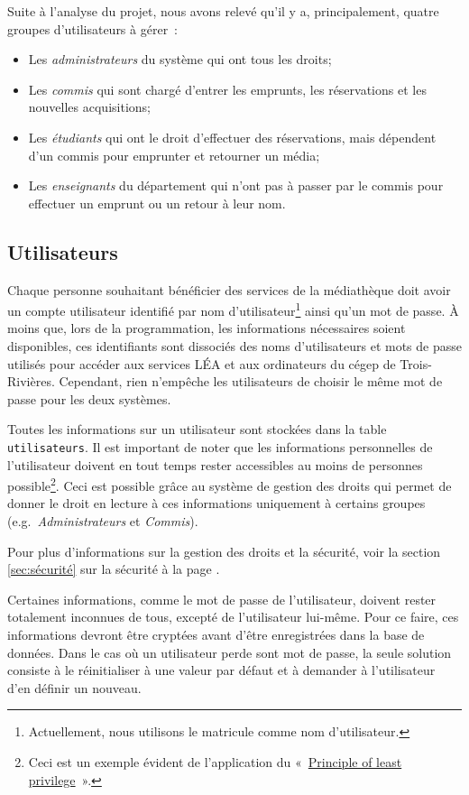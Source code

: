 \documentclass[letter, 11pt]{report}
\begin{document}
Suite à l'analyse du projet, nous avons relevé qu'il y a, principalement, quatre groupes d'utilisateurs à gérer~:
\begin{itemize}
	\item Les \emph{administrateurs} du système qui ont tous les droits;
	\item Les \emph{commis} qui sont chargé d'entrer les emprunts, les réservations et les nouvelles acquisitions;
	\item Les \emph{étudiants} qui ont le droit d'effectuer des réservations, mais dépendent d'un commis pour emprunter et retourner un média;
	\item Les \emph{enseignants} du département qui n'ont pas à passer par le commis pour effectuer un emprunt ou un retour à leur nom.
\end{itemize}

\subsection{Utilisateurs}
Chaque personne souhaitant bénéficier des services de la médiathèque doit avoir un compte utilisateur identifié par nom d'utilisateur\footnote{Actuellement, nous utilisons le matricule comme nom d'utilisateur.} ainsi qu'un mot de passe. À moins que, lors de la programmation, les informations nécessaires soient disponibles, ces identifiants sont dissociés des noms d'utilisateurs et mots de passe utilisés pour accéder aux services LÉA et aux ordinateurs du cégep de Trois-Rivières. Cependant, rien n'empêche les utilisateurs de choisir le même mot de passe pour les deux systèmes.

Toutes les informations sur un utilisateur sont stockées dans la table \texttt{utilisateurs}. Il est important de noter que les informations personnelles de l'utilisateur doivent en tout temps rester accessibles au moins de personnes possible\footnote{Ceci est un exemple évident de l'application du «~\href{http://en.wikipedia.org/wiki/Principle_of_least_privilege}{Principle of least privilege}~».}. Ceci est possible grâce au système de gestion des droits qui permet de donner le droit en lecture à ces informations uniquement à certains groupes (e.g.\ \emph{Administrateurs} et \emph{Commis}).

Pour plus d'informations sur la gestion des droits et la sécurité, voir la section \ref{sec:sécurité} sur la sécurité à la page \pageref{sec:sécurité}.

Certaines informations, comme le mot de passe de l'utilisateur, doivent rester totalement inconnues de tous, excepté de l'utilisateur lui-même. Pour ce faire, ces informations devront être cryptées avant d'être enregistrées dans la base de données. Dans le cas où un utilisateur perde sont mot de passe, la seule solution consiste à le réinitialiser à une valeur par défaut et à demander à l'utilisateur d'en définir un nouveau.
\end{document}
